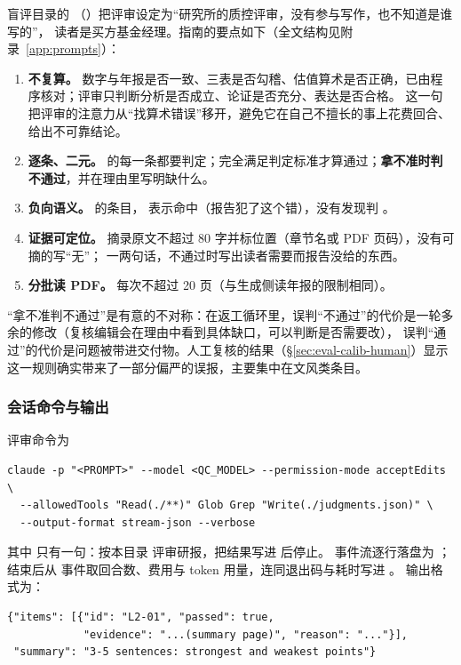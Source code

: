 盲评目录的 （）把评审设定为“研究所的质控评审，没有参与写作，也不知道是谁写的”，
读者是买方基金经理。指南的要点如下（全文结构见附录~\ref{app:prompts}）：
\begin{enumerate}
  \item \textbf{不复算。} 数字与年报是否一致、三表是否勾稽、估值算术是否正确，已由程序核对；评审只判断分析是否成立、论证是否充分、表达是否合格。
        这一句把评审的注意力从“找算术错误”移开，避免它在自己不擅长的事上花费回合、给出不可靠结论。
  \item \textbf{逐条、二元。}  的每一条都要判定；完全满足判定标准才算通过；\textbf{拿不准时判不通过}，并在理由里写明缺什么。
  \item \textbf{负向语义。}  的条目， 表示命中（报告犯了这个错），没有发现判 。
  \item \textbf{证据可定位。}  摘录原文不超过 80 字并标位置（章节名或 PDF 页码），没有可摘的写“无”； 一两句话，不通过时写出读者需要而报告没给的东西。
  \item \textbf{分批读 PDF。} 每次不超过 20 页（与生成侧读年报的限制相同）。
\end{enumerate}

“拿不准判不通过”是有意的不对称：在返工循环里，误判“不通过”的代价是一轮多余的修改（复核编辑会在理由中看到具体缺口，可以判断是否需要改），
误判“通过”的代价是问题被带进交付物。人工复核的结果（\S\ref{sec:eval-calib-human}）显示这一规则确实带来了一部分偏严的误报，主要集中在文风类条目。

\subsubsection{会话命令与输出}

评审命令为
\begin{lstlisting}
claude -p "<PROMPT>" --model <QC_MODEL> --permission-mode acceptEdits \
  --allowedTools "Read(./**)" Glob Grep "Write(./judgments.json)" \
  --output-format stream-json --verbose
\end{lstlisting}
其中  只有一句：按本目录  评审研报，把结果写进  后停止。
事件流逐行落盘为 ；结束后从  事件取回合数、费用与 token 用量，连同退出码与耗时写进 。
输出格式为：
\begin{lstlisting}
{"items": [{"id": "L2-01", "passed": true,
            "evidence": "...(summary page)", "reason": "..."}],
 "summary": "3-5 sentences: strongest and weakest points"}
\end{lstlisting}

